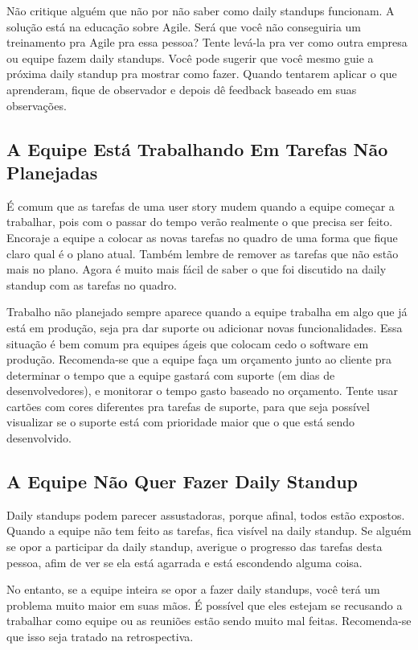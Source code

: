 \documentclass[a4paper, 10pt, font=plain]{abnt}
\begin{document}
Não critique alguém que não por não saber como daily standups funcionam. A solução está na educação sobre Agile. Será que você não conseguiria um treinamento pra Agile pra essa pessoa? Tente levá-la pra ver como outra empresa ou equipe fazem daily standups. Você pode sugerir que você mesmo guie a próxima daily standup pra mostrar como fazer. Quando tentarem aplicar o que aprenderam, fique de observador e depois dê feedback baseado em suas observações.


\subsection{A Equipe Está Trabalhando Em Tarefas Não Planejadas}
É comum que as tarefas de uma user story mudem quando a equipe começar a trabalhar, pois com o passar do tempo verão realmente o que precisa ser feito. Encoraje a equipe a colocar as novas tarefas no quadro de uma forma que fique claro qual é o plano atual. Também lembre de remover as tarefas que não estão mais no plano. Agora é muito mais fácil de saber o que foi discutido na daily standup com as tarefas no quadro.

Trabalho não planejado sempre aparece quando a equipe trabalha em algo que já está em produção, seja pra dar suporte ou adicionar novas funcionalidades. Essa situação é bem comum pra equipes ágeis que colocam cedo o software em produção. Recomenda-se que a equipe faça um orçamento junto ao cliente pra determinar o tempo que a equipe gastará com suporte (em dias de desenvolvedores), e monitorar o tempo gasto baseado no orçamento. Tente usar cartões com cores diferentes pra tarefas de suporte, para que seja possível visualizar se o suporte está com prioridade maior que o que está sendo desenvolvido.



\subsection{A Equipe Não Quer Fazer Daily Standup}
Daily standups podem parecer assustadoras, porque afinal, todos estão expostos. Quando a equipe não tem feito as tarefas, fica visível na daily standup. Se alguém se opor a participar da daily standup, averigue o progresso das tarefas desta pessoa, afim de ver se ela está agarrada e está escondendo alguma coisa.

No entanto, se a equipe inteira se opor a fazer daily standups, você terá um problema muito maior em suas mãos. É possível que eles estejam se recusando a trabalhar como equipe ou as reuniões estão sendo muito mal feitas. Recomenda-se que isso seja tratado na retrospectiva.
\end{document}
